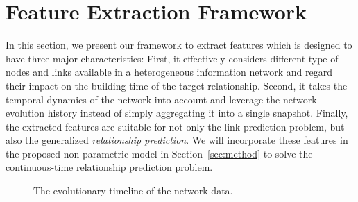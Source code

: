 \section{Feature Extraction Framework}\label{sec:features}

In this section, we present our framework to extract features which is designed to have three major characteristics: First, it effectively considers different type of nodes and links available in a heterogeneous information network and regard their impact on the building time of the target relationship. Second, it takes the temporal dynamics of the network into account and leverage the network evolution history instead of simply aggregating it into a single snapshot. Finally, the extracted features are suitable for not only the link prediction problem, but also the generalized \emph{relationship prediction}. We will incorporate these features in the proposed non-parametric model in Section~\ref{sec:method} to solve the continuous-time relationship prediction problem.

\begin{figure}
\begin{chronology}[align=left, startyear=0,stopyear=200, width=\columnwidth, height=1pt, startdate=false, stopdate=false, arrowwidth=4pt, arrowheight=3pt]
	\scriptsize
\end{chronology}
\caption{The evolutionary timeline of the network data.}
\label{fig:timeline}
\end{figure}



